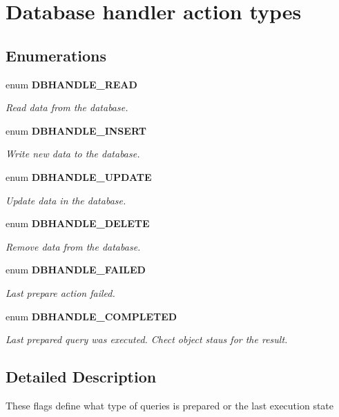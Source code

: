 \section{Database handler action types}
\label{group__DBHANDLE__ActionTypes}
\subsection*{Enumerations}
\begin{DoxyCompactItemize}
\item 
enum {\bf DBHANDLE\_\-READ} 
\begin{DoxyCompactList}\small\item\em Read data from the database. \end{DoxyCompactList}\item 
enum {\bf DBHANDLE\_\-INSERT} 
\begin{DoxyCompactList}\small\item\em Write new data to the database. \end{DoxyCompactList}\item 
enum {\bf DBHANDLE\_\-UPDATE} 
\begin{DoxyCompactList}\small\item\em Update data in the database. \end{DoxyCompactList}\item 
enum {\bf DBHANDLE\_\-DELETE} 
\begin{DoxyCompactList}\small\item\em Remove data from the database. \end{DoxyCompactList}\item 
enum {\bf DBHANDLE\_\-FAILED} 
\begin{DoxyCompactList}\small\item\em Last prepare action failed. \end{DoxyCompactList}\item 
enum {\bf DBHANDLE\_\-COMPLETED} 
\begin{DoxyCompactList}\small\item\em Last prepared query was executed. Chect object staus for the result. \end{DoxyCompactList}\end{DoxyCompactItemize}


\subsection{Detailed Description}
These flags define what type of queries is prepared or the last execution state 

